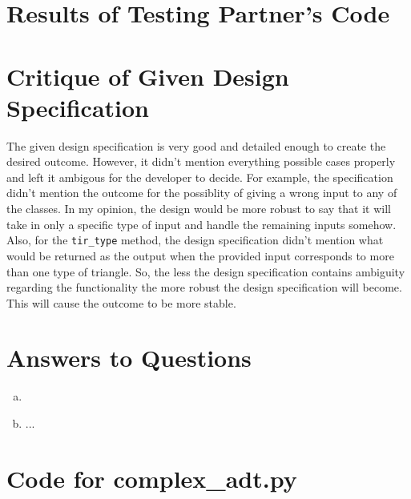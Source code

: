 \documentclass[12pt]{article}
\begin{document}
\section{Results of Testing Partner's Code}


\section{Critique of Given Design Specification}
The given design specification is very good and detailed enough to create the desired outcome. 
However, it didn't mention everything possible cases properly and left it ambigous for the developer to decide. For example, the specification didn't mention the outcome for the possiblity of giving a wrong input to any of the classes. In my opinion, the design would be more robust to say that it will take in only a specific type of input and handle the remaining inputs somehow. Also, for the \verb|tir_type| method, the design specification didn't mention what would be 
returned as the output when the provided input corresponds to more than one type of triangle. So, 
the less the design specification contains ambiguity regarding the functionality the more robust
the design specification will become. This will cause the outcome to be more stable.


\section{Answers to Questions}

\begin{enumerate}[(a)]
	\item 
	\item ...

\end{enumerate}

\newpage

\lstset{language=Python, basicstyle=\tiny, breaklines=true, showspaces=false,
  showstringspaces=false, breakatwhitespace=true}

\def\thesection{\Alph{section}}

\section{Code for complex\_adt.py}

\noindent 

\newpage
\end{document}
